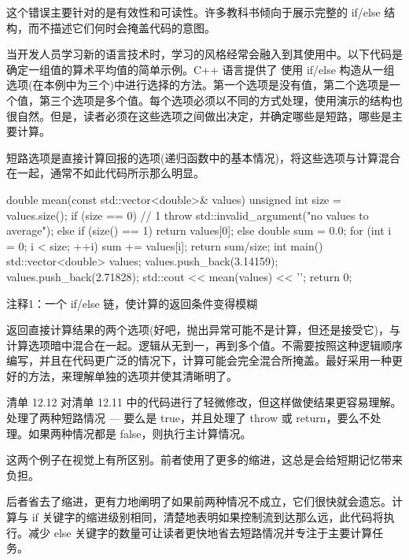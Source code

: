 这个错误主要针对的是有效性和可读性。许多教科书倾向于展示完整的 if/else 结构，而不描述它们何时会掩盖代码的意图。


当开发人员学习新的语言技术时，学习的风格经常会融入到其使用中。以下代码是确定一组值的算术平均值的简单示例。C++ 语言提供了 使用 if/else 构造从一组选项(在本例中为三个)中进行选择的方法。第一个选项是没有值，第二个选项是一个值，第三个选项是多个值。每个选项必须以不同的方式处理，使用演示的结构也很自然。但是，读者必须在这些选项之间做出决定，并确定哪些是短路，哪些是主要计算。

短路选项是直接计算回报的选项(递归函数中的基本情况)，将这些选项与计算混合在一起，通常不如此代码所示那么明显。


\begin{cpp}
double mean(const std::vector<double>& values) {
  unsigned int size = values.size();
  if (size == 0) // 1
    throw std::invalid_argument("no values to average");
  else if (size() == 1)
    return values[0];
  else {
    double sum = 0.0;
    for (int i = 0; i < size; ++i)
      sum += values[i];
    return sum/size;
  }
}
int main() {
  std::vector<double> values;
  values.push_back(3.14159);
  values.push_back(2.71828);
  std::cout << mean(values) << '\n';
  return 0;
}
\end{cpp}

{\footnotesize
注释1：一个 if/else 链，使计算的返回条件变得模糊
}


返回直接计算结果的两个选项(好吧，抛出异常可能不是计算，但还是接受它)，与计算选项暗中混合在一起。逻辑从无到一，再到多个值。不需要按照这种逻辑顺序编写，并且在代码更广泛的情况下，计算可能会完全混合所掩盖。最好采用一种更好的方法，来理解单独的选项并使其清晰明了。


清单 12.12 对清单 12.11 中的代码进行了轻微修改，但这样做使结果更容易理解。处理了两种短路情况 — 要么是 true，并且处理了 throw 或 return，要么不处理。如果两种情况都是 false，则执行主计算情况。

这两个例子在视觉上有所区别。前者使用了更多的缩进，这总是会给短期记忆带来负担。

后者省去了缩进，更有力地阐明了如果前两种情况不成立，它们很快就会遗忘。计算与 if 关键字的缩进级别相同，清楚地表明如果控制流到达那么远，此代码将执行。减少 else 关键字的数量可让读者更快地省去短路情况并专注于主要计算任务。

